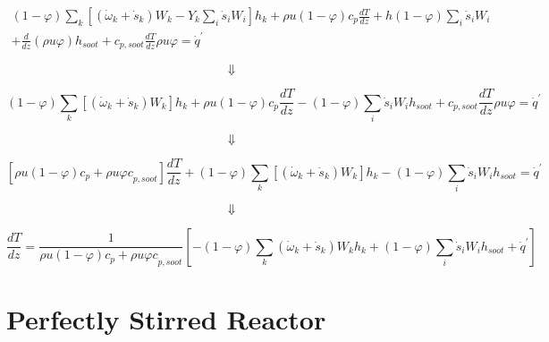 \begin{equation*}
	\begin{split}
	\left(1-\varphi\right)\sum_{k}{\left[({\dot{\omega}}_k+{\dot{s}}_k)W_k-Y_k\sum_{i}{{\dot{s}}_iW_i}\right]h_k}+\rho u
	\left(1-\varphi\right)
	c_{p}\frac{dT}{dz}
	+ h(1-\varphi)\sum_{i}{{\dot{s}}_iW_i}
	\\
	+
	\frac{d}{dz}\left(\rho u\varphi\right)h_{soot}+c_{p,soot}\frac{dT}{dz}\rho u\varphi={\dot{q}}^\prime
	\end{split}
\end{equation*}

\begin{equation*}
	\Downarrow
\end{equation*}

\begin{equation*}
	\left(1-\varphi\right)\sum_{k}{\left[({\dot{\omega}}_k+{\dot{s}}_k)W_k\right]h_k}
	+
	\rho u\left(1-\varphi\right)c_p\frac{dT}{dz}-(1-\varphi)\sum_{i}{{\dot{s}}_iW_i}h_{soot}+c_{p,soot}\frac{dT}{dz}\rho u\varphi={\dot{q}}^\prime
\end{equation*}

\begin{equation*}
	\Downarrow
\end{equation*}


\begin{equation*}
	\left[\rho u\left(1-\varphi\right){c}_p+{\rho u\varphi c}_{p,soot}\right]\frac{dT}{dz}+\left(1-\varphi\right)\sum_{k}{\left[({\dot{\omega}}_k+{\dot{s}}_k)W_k\right]h_k}-(1-\varphi)\sum_{i}{{\dot{s}}_iW_i}h_{soot}={\dot{q}}^\prime
\end{equation*}

\begin{equation*}
	\Downarrow
\end{equation*}


\begin{equation*}
	\frac{dT}{dz}=\frac{1}{\rho u\left(1-\varphi\right){c}_p+{\rho u\varphi c}_{p,soot}}\left[-\left(1-\varphi\right)\sum_{k}{\left({\dot{\omega}}_k+{\dot{s}}_k\right)W_kh_k}+\left(1-\varphi\right)\sum_{i}{{\dot{s}}_iW_i}h_{soot}+{\dot{q}}^\prime\right]
\end{equation*}
\section{Perfectly Stirred Reactor}
\label{sec:derivpsr}

